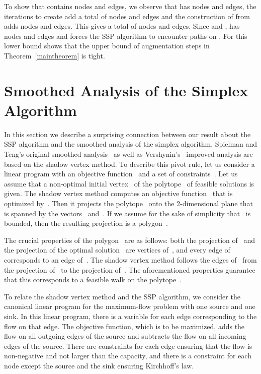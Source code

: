 \documentclass[11pt]{article}
\begin{document}
To show that  contains  nodes and  edges, we
observe that  has  nodes and  edges, the  iterations to
create  add a total of  nodes and  edges and the construction
of  from  adds  nodes and  edges. This gives a total of
 nodes and  edges. Since  and ,  has  nodes and  edges and forces the SSP
algorithm to encounter  paths on . For  this lower
bound shows that the upper bound of  augmentation steps in
Theorem~\ref{maintheorem} is tight.

\section{Smoothed Analysis of the Simplex Algorithm}
\label{sec:simplex}

In this section we describe a surprising connection between our result about the SSP algorithm and the smoothed analysis of the
simplex algorithm. Spielman and Teng's original smoothed analysis~\cite{DBLP:journals/jacm/SpielmanT04} as well as 
Vershynin's~\cite{DBLP:journals/siamcomp/Vershynin09} improved analysis are based on the shadow vertex method. To describe this
pivot rule, let us consider a linear program with an objective function~ and a set of constraints~. Let us
assume that a non-optimal initial
vertex~ of the polytope~ of feasible solutions is given. The shadow vertex method computes an objective function~ that is
optimized by~. Then it projects the polytope~ onto the 2-dimensional plane that is spanned by the vectors~ and~. If we assume
for the sake of simplicity that~ is bounded, then the resulting projection is a polygon~.

The crucial properties of the polygon~ are as follows: both the projection of~ and the projection of the optimal solution~ are vertices of~, and every edge of~ corresponds to an edge of~. The shadow vertex method follows the edges of~ from the projection
of~ to the projection of~. The aforementioned properties guarantee that this corresponds to a feasible walk on the polytope~. 

To relate the shadow vertex method and the SSP algorithm, we consider the canonical linear program for the maximum-flow problem with one
source and one sink. In this linear program, there is a variable for each edge corresponding to the flow on that edge.
The objective function, which is to be
maximized, adds the flow on all outgoing edges of the source and subtracts the flow on all incoming edges of the source. There are constraints for each edge 
ensuring that the flow is non-negative and not larger than the capacity, and there is a constraint for each node except the source and the sink ensuring
Kirchhoff's law.
\end{document}
